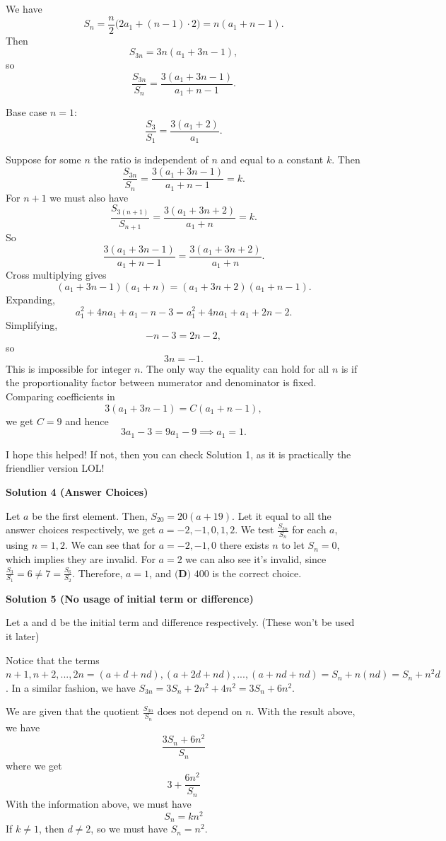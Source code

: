 \begin{enumerate}
 We have
 \[S_n=\frac{n}{2}\big(2a_1+(n-1)\cdot 2\big)=n(a_1+n-1).\]Then
 \[S_{3n}=3n(a_1+3n-1),\]so
 \[\frac{S_{3n}}{S_n}=\frac{3(a_1+3n-1)}{a_1+n-1}.\]

 Base case \( n=1 \):
 \[\frac{S_3}{S_1}=\frac{3(a_1+2)}{a_1}.\]

 Suppose for some \( n \) the ratio is independent of \( n \) and equal to a constant \( k \). Then
 \[\frac{S_{3n}}{S_n}=\frac{3(a_1+3n-1)}{a_1+n-1}=k.\]For \( n+1 \) we must also have
 \[\frac{S_{3(n+1)}}{S_{n+1}}=\frac{3(a_1+3n+2)}{a_1+n}=k.\]So
 \[\frac{3(a_1+3n-1)}{a_1+n-1}=\frac{3(a_1+3n+2)}{a_1+n}.\]Cross multiplying gives
 \[(a_1+3n-1)(a_1+n)=(a_1+3n+2)(a_1+n-1).\]Expanding,
 \[a_1^2+4na_1+a_1- n -3 = a_1^2+4na_1+a_1+2n-2.\]Simplifying,
 \[- n -3 = 2n -2,\]so
 \[3n = -1.\]This is impossible for integer \( n \). The only way the equality can hold for all \( n \) is if the proportionality factor between numerator and denominator is fixed. Comparing coefficients in
 \[3(a_1+3n-1)=C(a_1+n-1),\]we get \( C=9 \) and hence
 \[3a_1-3=9a_1-9 \implies a_1=1.\]

 I hope this helped! If not, then you can check Solution 1, as it is practically the friendlier version LOL!

 



\textbf{Solution 4 (Answer Choices)}

Let $a$ be the first element. Then, $S_{20}=20(a+19)$. Let it equal to all the answer choices respectively, we get $a=-2, -1, 0, 1, 2$. We test $\frac{S_{3n}}{S_n}$ for each $a$, using $n=1, 2$. We can see that for $a=-2, -1, 0$ there exists $n$ to let $S_n=0$, which implies they are invalid. For $a=2$ we can also see it's invalid, since $\frac{S_3}{S_1}=6\neq7=\frac{S_6}{S_2}$. Therefore, $a=1$, and $\boxed{\textbf{(D) } 400}$ is the correct choice.

 



\textbf{Solution 5 (No usage of initial term or difference)}

Let a and d be the initial term and difference respectively. (These won't be used it later)

 Notice that the terms $n+1,n+2,...,2n=(a+d+nd),(a+2d+nd),...,(a+nd+nd)=S_{n}+n(nd)=S_{n}+n^2d$. In a similar fashion, we have $S_{3n}=3S_{n}+2n^2+4n^2=3S_{n}+6n^2$.

 We are given that the quotient $\frac{S_{3n}}{S_n}$ does not depend on $n$. With the result above, we have  
 \[\frac{3S_{n}+6n^2}{S_n}\]where we get
 \[3+\frac{6n^2}{S_n}\]With the information above, we must have
 \[S_{n}=kn^2\]If $k\neq1$, then ${d\neq2}$, so we must have $S_{n}=n^2$.


\end{enumerate}
